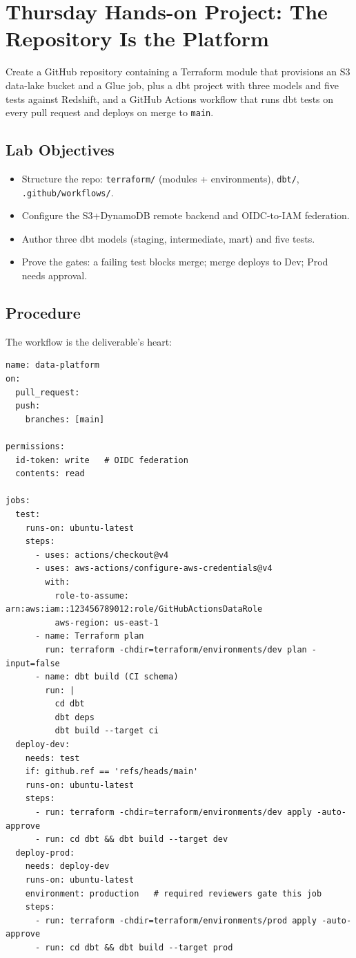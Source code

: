 \section{Thursday Hands-on Project: The Repository Is the Platform}
Create a GitHub repository containing a Terraform module that provisions an S3 data-lake bucket and a Glue job, plus a dbt project with three models and five tests against Redshift, and a GitHub Actions workflow that runs dbt tests on every pull request and deploys on merge to \texttt{main}.

\subsection*{Lab Objectives}
\begin{itemize}
    \item Structure the repo: \texttt{terraform/} (modules + environments), \texttt{dbt/}, \texttt{.github/workflows/}.
    \item Configure the S3+DynamoDB remote backend and OIDC-to-IAM federation.
    \item Author three dbt models (staging, intermediate, mart) and five tests.
    \item Prove the gates: a failing test blocks merge; merge deploys to Dev; Prod needs approval.
\end{itemize}

\subsection*{Procedure}
The workflow is the deliverable's heart:

\begin{lstlisting}[caption={.github/workflows/data-platform.yml (abridged).},label={lst:ch24-actions}]
name: data-platform
on:
  pull_request:
  push:
    branches: [main]

permissions:
  id-token: write   # OIDC federation
  contents: read

jobs:
  test:
    runs-on: ubuntu-latest
    steps:
      - uses: actions/checkout@v4
      - uses: aws-actions/configure-aws-credentials@v4
        with:
          role-to-assume: arn:aws:iam::123456789012:role/GitHubActionsDataRole
          aws-region: us-east-1
      - name: Terraform plan
        run: terraform -chdir=terraform/environments/dev plan -input=false
      - name: dbt build (CI schema)
        run: |
          cd dbt
          dbt deps
          dbt build --target ci
  deploy-dev:
    needs: test
    if: github.ref == 'refs/heads/main'
    runs-on: ubuntu-latest
    steps:
      - run: terraform -chdir=terraform/environments/dev apply -auto-approve
      - run: cd dbt && dbt build --target dev
  deploy-prod:
    needs: deploy-dev
    runs-on: ubuntu-latest
    environment: production   # required reviewers gate this job
    steps:
      - run: terraform -chdir=terraform/environments/prod apply -auto-approve
      - run: cd dbt && dbt build --target prod
\end{lstlisting}

